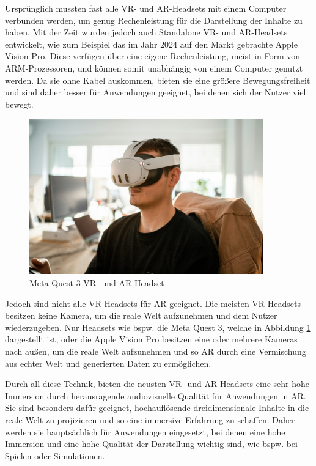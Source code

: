     
    Ursprünglich mussten fast alle VR- und AR-Headsets mit einem Computer verbunden werden, um genug Rechenleistung für die Darstellung der Inhalte zu haben.
    Mit der Zeit wurden jedoch auch Standalone VR- und AR-Headsets entwickelt, wie zum Beispiel das im Jahr 2024 auf den Markt gebrachte Apple Vision Pro.
    Diese verfügen über eine eigene Rechenleistung, meist in Form von ARM-Prozessoren, und können somit unabhängig von einem Computer genutzt werden.
    Da sie ohne Kabel auskommen, bieten sie eine größere Bewegungsfreiheit und sind daher besser für Anwendungen geeignet, bei denen sich der Nutzer viel bewegt.

    \begin{figure}[H]
      \centering
      \includegraphics[width=0.9\textwidth]{images/quest3_example.jpg}
      \caption{Meta Quest 3 VR- und AR-Headset}
      \label{fig:oculus-quest-3}
    \end{figure}

    Jedoch sind nicht alle VR-Headsets für AR geeignet.
    Die meisten VR-Headsets besitzen keine Kamera, um die reale Welt aufzunehmen und dem Nutzer wiederzugeben.
    Nur Headsets wie bspw. die Meta Quest 3, welche in Abbildung \ref{fig:oculus-quest-3} dargestellt ist, oder die Apple Vision Pro besitzen eine oder mehrere Kameras nach außen, um die reale Welt aufzunehmen und so AR durch eine Vermischung aus echter Welt und generierten Daten zu ermöglichen.
    
    Durch all diese Technik, bieten die neusten VR- und AR-Headsets eine sehr hohe Immersion durch herausragende audiovisuelle Qualität für Anwendungen in AR.
    Sie sind besonders dafür geeignet, hochauflösende dreidimensionale Inhalte in die reale Welt zu projizieren und so eine immersive Erfahrung zu schaffen.
    Daher werden sie hauptsächlich für Anwendungen eingesetzt, bei denen eine hohe Immersion und eine hohe Qualität der Darstellung wichtig sind, wie bspw. bei Spielen oder Simulationen.

